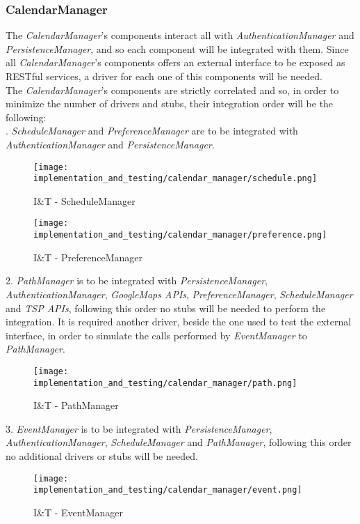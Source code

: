 \subsubsection{CalendarManager}
The \textit{CalendarManager}'s components interact all with \textit{AuthenticationManager} and \textit{PersistenceManager}, and so each component will be integrated with them. Since all \textit{CalendarManager}'s components offers an external interface to be exposed as RESTful services, a driver for each one of this components will be needed.\\
The \textit{CalendarManager}'s components are strictly correlated and so, in order to minimize the number of drivers and stubs, their integration order will be the following:\\
. \textit{ScheduleManager} and \textit{PreferenceManager} are to be integrated with \textit{AuthenticationManager} and \textit{PersistenceManager}.
\begin{figure}[H]
	\begin{center}
		\texttt{[image: implementation\_and\_testing/calendar\_manager/schedule.png]}
	\end{center}
	\caption{I\&T - ScheduleManager}
\end{figure}
\begin{figure}[H]
	\begin{center}
		\texttt{[image: implementation\_and\_testing/calendar\_manager/preference.png]}
	\end{center}
	\caption{I\&T - PreferenceManager}
\end{figure}

2. \textit{PathManager} is to be integrated with \textit{PersistenceManager}, \textit{AuthenticationManager}, \textit{GoogleMaps APIs}, \textit{PreferenceManager}, \textit{ScheduleManager} and \textit{TSP APIs}, following this order no stubs will be needed to perform the integration. It is required another driver, beside the one used to test the external interface, in order to simulate the calls performed by \textit{EventManager} to \textit{PathManager}.
\begin{figure}[H]
	\begin{center}
		\texttt{[image: implementation\_and\_testing/calendar\_manager/path.png]}
	\end{center}
	\caption{I\&T - PathManager}
\end{figure}

3. \textit{EventManager} is to be integrated with \textit{PersistenceManager}, \textit{AuthenticationManager}, \textit{ScheduleManager} and \textit{PathManager}, following this order no additional drivers or stubs will be needed.
\begin{figure}[H]
	\begin{center}
		\texttt{[image: implementation\_and\_testing/calendar\_manager/event.png]}
	\end{center}
	\caption{I\&T - EventManager}
\end{figure}

